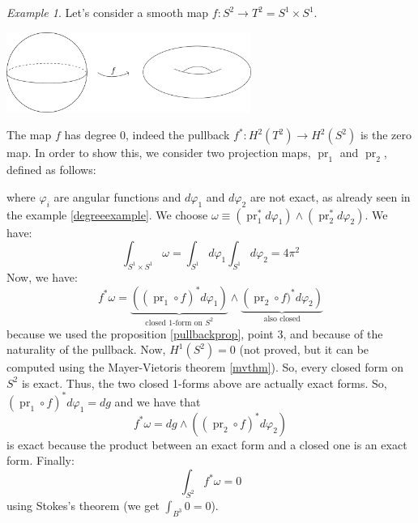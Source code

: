 \documentclass[a4paper,11pt,titlepage, article, oneside]{memoir}
\numberwithin{equation}{section}
\theoremstyle{definition}
\theoremstyle{remark}
\newtheorem{example}[theorem]{Example}
\DeclareMathOperator{\pr}{pr}
\begin{document}
\begin{tcolorbox}
\begin{example}
Let's consider a smooth map $f \colon S^2 \rightarrow T^2=S^1 \times S^1$.
\begin{minipage}{\textwidth} \label{Fig:torus}
\vspace{1em}
     \centering
     \includegraphics[width=0.6\textwidth]{Images/torus.pdf} 
\end{minipage}
The map $f$ has degree 0, indeed the pullback $f^*\colon H^2(T^2) \rightarrow H^2(S^2)$ is the zero map. In order to show this, we consider two projection maps, $\pr_1$ and $\pr_2$, defined as follows:
\begin{center}
\end{center}
where  $\varphi_i$ are angular functions and $d\varphi_1$ and $d\varphi_2$ are not exact, as already seen in the example \ref{degreeexample}.
We choose $\omega \equiv (\pr_1^* d \varphi_1) \wedge (\pr_2^* d\varphi_2)$. We have:
$$\int_{S^1 \times S^1} \omega = \int_{S^1} d\varphi_1 \int_{S^1} d\varphi_2 = 4 \pi^2$$
Now, we have:
$$f^* \omega = \underbrace{\left ( (\pr_1 \circ f)^* d \varphi_1 \right )}_{\text{closed 1-form on }S^2} \wedge \underbrace{\left( \pr_2 \circ f)^* d \varphi_2 \right)}_{\text{also closed}}$$
 because we used the proposition \ref{pullbackprop}, point 3, and because of the naturality of the pullback. Now, $H^1(S^2)=0$ (not proved, but it can be computed using the Mayer-Vietoris theorem \ref{mvthm}). So, every closed form on $S^2$ is exact. Thus, the two closed 1-forms above are actually exact forms.
So, $(\pr_1\circ f)^*d\varphi_1 = d g$ and we have that
$$f^*\omega = dg \wedge \left( (\pr_2 \circ f)^* d \varphi_2 \right)$$ is exact because the product between an exact form  and a closed one is an exact form. Finally:
$$\int_{S^2} f^* \omega = 0$$
using Stokes's theorem (we get $\int_{B^3} 0=0$).
\end{example}
\end{tcolorbox}
\end{document}
